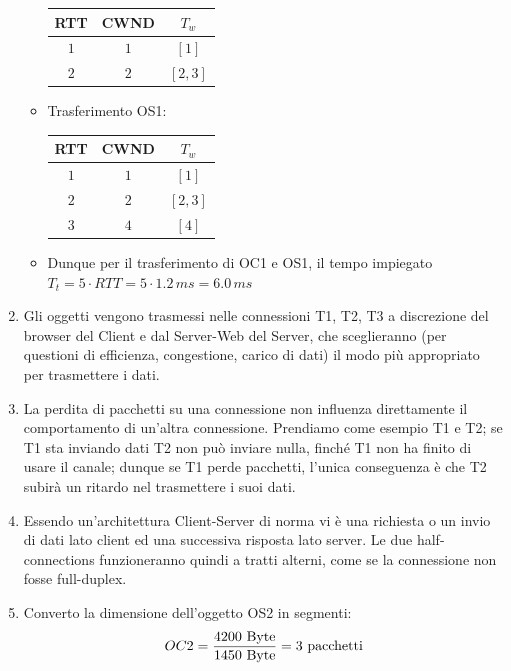 \documentclass[10pt]{article}
\newcommand{\lightrule}{%
	\arrayrulecolor{black!30}%
	\midrule[\lightrulewidth]%
	\arrayrulecolor{black}}
\begin{document}
\begin{enumerate}
\begin{itemize}
\begin{center}
\begin{tabular}{@{} *{3}{c} @{}}
 					\textbf{RTT} & \textbf{CWND} & \textbf{$T_w$} \\ 
 				\midrule
 					$1$ & $1$ & $[1]$ \\ 
				\lightrule
 					$2$ & $2$ & $[2,3]$ \\
				\bottomrule
				\end{tabular}
			\end{center}
			\item Trasferimento OS1:
			\begin{center}
				\centering
 				\begin{tabular}{@{} *{3}{c} @{}}
 				\toprule
 					\textbf{RTT} & \textbf{CWND} & \textbf{$T_w$} \\
 				\midrule
 					$1$ & $1$ & $[1]$ \\ 
				\lightrule
 					$2$ & $2$ & $[2,3]$ \\
 				\lightrule
 					$3$ & $4$ & $[4]$ \\
				\bottomrule
				\end{tabular}
			\end{center}
			\item Dunque per il trasferimento di OC1 e OS1, il tempo impiegato $T_t = 5 \cdot RTT = 5 \cdot 1.2 \,ms = 6.0 \,ms$
		\end{itemize}
	\item Gli oggetti vengono trasmessi nelle connessioni T1, T2, T3 a discrezione del browser del Client e dal Server-Web del Server, che sceglieranno (per questioni di efficienza, congestione, carico di dati) il modo più appropriato per trasmettere i dati.
	\item La perdita di pacchetti su una connessione non influenza direttamente il comportamento di un'altra connessione. Prendiamo come esempio T1 e T2; se T1 sta inviando dati T2 non può inviare nulla, finché T1 non ha finito di usare il canale; dunque se T1 perde pacchetti, l'unica conseguenza è che T2 subirà un ritardo nel trasmettere i suoi dati.
	\item Essendo un'architettura Client-Server di norma vi è una richiesta o un invio di dati lato client ed una successiva risposta lato server. Le due half-connections funzioneranno quindi a tratti alterni, come se la connessione non fosse full-duplex.
	\color{black}
	\item Converto la dimensione dell'oggetto OS2 in segmenti:
		 	\begin{equation}
			\notag
			\begin{split}
				OC2 & = \frac{4200 \textrm{ Byte}}{1450 \textrm{ Byte}} = 3 \textrm{ pacchetti}\\

\end{split}
\end{equation}
\end{enumerate}
\end{document}
